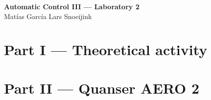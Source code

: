 \documentclass[10pt,a4paper]{article}
\newcounter{reportfigure}
\begin{document}
\begin{center}
{\Large\bfseries Automatic Control III --- Laboratory 2}\\[2pt]
{\normalsize Mat\'{i}as Garc\'{i}a \qquad Lars Snoeijink}
\end{center}
\part*{Part I --- Theoretical activity}
\renewcommand{\theequation}{I.\arabic{equation}}
\renewcommand{\thereportfigure}{I.\arabic{reportfigure}}

\clearpage

\clearpage

\clearpage

\clearpage
\part*{Part II --- Quanser AERO 2}
\setcounter{equation}{0}
\setcounter{reportfigure}{0}
\renewcommand{\theequation}{II.\arabic{equation}}
\renewcommand{\thereportfigure}{II.\arabic{reportfigure}}

\clearpage

\clearpage

\clearpage


\clearpage

\clearpage

\clearpage

\end{document}
